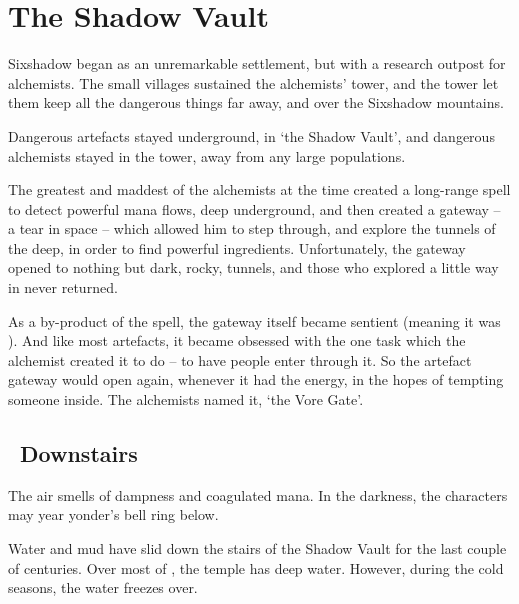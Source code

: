 \section[Shadow Vault]{The Shadow Vault}
\label{shadowVault}

\begin{multicols}{2}


\begin{exampletext}
  \noindent
  Sixshadow began as an unremarkable settlement, but with a research outpost for alchemists.
  The small \glspl{village} sustained the alchemists' tower, and the tower let them keep all the dangerous things far away, and over the Sixshadow mountains.

  Dangerous \glspl{artefact} stayed underground, in `the Shadow Vault', and dangerous alchemists stayed in the tower, away from any large populations.

  The greatest and maddest of the alchemists at the time created a long-range spell to detect powerful mana flows, deep underground, and then created a gateway -- a tear in space -- which allowed him to step through, and explore the tunnels of the \gls{deep}, in order to find powerful \glspl{ingredient}.
  Unfortunately, the gateway opened to nothing but dark, rocky, tunnels, and those who explored a little way in never returned.

  As a by-product of the spell, the gateway itself became sentient (meaning it was ).
  And like most \glspl{artefact}, it became obsessed with the one task which the alchemist created it to do -- to have people enter through it.
  So the \gls{artefact} gateway would open again, whenever it had the energy, in the hopes of tempting someone inside.
  The alchemists named it, `the Vore Gate'.
\end{exampletext}

\subsection[Downstairs]{~Downstairs~}

The air smells of dampness and coagulated mana.
In the darkness, the characters may year \gls{yonder}'s bell ring below.


\begin{exampletext}
  Water and mud have slid down the stairs of the Shadow Vault for the last couple of centuries.
  Over most of , the temple has deep water.
  However, during the cold seasons, the water freezes over.
\end{exampletext}


\end{multicols}
